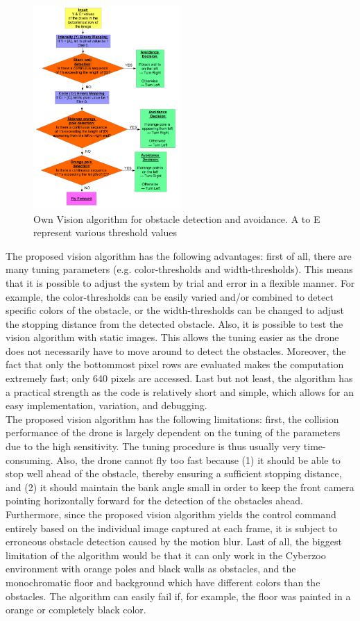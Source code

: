 \begin{figure}[h]
	\centering
	\includegraphics[width = 0.5\textwidth]{Figures/vision.png}
	\caption{Own Vision algorithm for obstacle detection and avoidance. A to E represent various threshold values}
	\label{own_vision}
\end{figure}

The proposed vision algorithm has the following advantages: first of all, there are many tuning parameters (e.g. color-thresholds and width-thresholds). This means that it is possible to adjust the system by trial and error in a flexible manner. For example, the color-thresholds can be easily varied and/or combined to detect specific colors of the obstacle, or the width-thresholds can be changed to adjust the stopping distance from the detected obstacle. Also, it is possible to test the vision algorithm with static images. This allows the tuning easier as the drone does not necessarily have to move around to detect the obstacles. Moreover, the fact that only the bottommost pixel rows are evaluated makes the computation extremely fast; only 640 pixels are accessed. Last but not least, the algorithm has a practical strength as the code is relatively short and simple, which allows for an easy implementation, variation, and debugging.\\

The proposed vision algorithm has the following limitations: first, the collision performance of the drone is largely dependent on the tuning of the parameters due to the high sensitivity. The tuning procedure is thus usually very time-consuming. Also, the drone cannot fly too fast because (1) it should be able to stop well ahead of the obstacle, thereby ensuring a sufficient stopping distance, and (2) it should maintain the bank angle small in order to keep the front camera pointing horizontally forward for the detection of the obstacles ahead. Furthermore, since the proposed vision algorithm yields the control command entirely based on the individual image captured at each frame, it is subject to erroneous obstacle detection caused by the motion blur. Last of all, the biggest limitation of the algorithm would be that it can only work in the Cyberzoo environment with orange poles and black walls as obstacles, and the monochromatic floor and background which have different colors than the obstacles. The algorithm can easily fail if, for example, the floor was painted in a orange or completely black color.